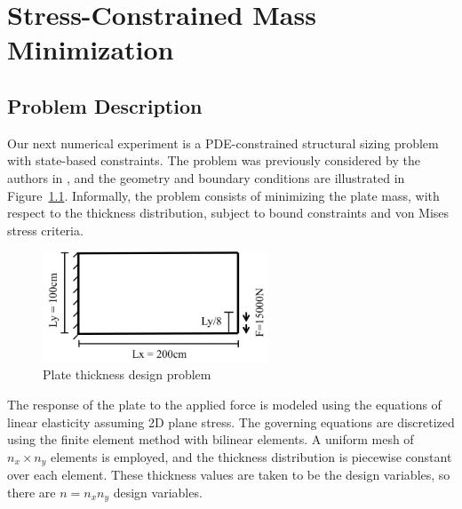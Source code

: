  
\chapter{Stress-Constrained Mass Minimization}

\section{Problem Description}
Our next numerical experiment is a PDE-constrained structural sizing problem
with state-based constraints.  The problem was previously considered by the
authors in \cite{dener:scitech2016}, and the geometry and boundary conditions
are illustrated in Figure~\ref{fig:struct}.  Informally, the problem consists of
minimizing the plate mass, with respect to the thickness distribution, subject
to bound constraints and von Mises stress criteria. 
\begin{figure}[tbp]
  \centering
  \includegraphics[width=0.6\textwidth]{./figs/chap6_fstopo/struct.png}
  \caption{Plate thickness design problem}
  \label{fig:struct}
\end{figure}

The response of the plate to the applied force is modeled using the equations of
linear elasticity assuming 2D plane stress.  The governing equations are
discretized using the finite element method with bilinear elements.
A uniform mesh of $n_x \times n_y$ elements is employed, and the thickness
distribution is piecewise constant over each element.  These thickness values
are taken to be the design variables, so there are $n = n_x n_y$ design
variables.

